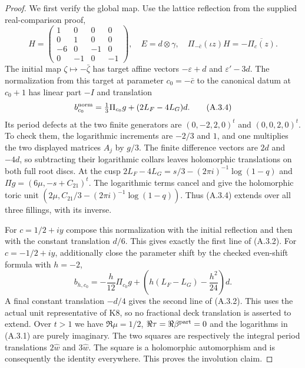 \begin{proof}
We first verify the global map. Use the lattice reflection from the
supplied real-comparison proof,
\[
 H=\begin{pmatrix}1&0&0&0\\0&1&0&0\\-6&0&-1&0\\0&-1&0&-1\end{pmatrix},
 \quad E=d\otimes\gamma,
 \quad\Pi_{-\bar c}(\iota z)H=-\overline{\Pi_c(z)}.
\]
The initial map $\zeta\mapsto-\bar\zeta$ has target affine vectors
$-\varepsilon+d$ and $\varepsilon'-3d$. The normalization from this
target at parameter $c_0=-\bar c$ to the canonical datum at $c_0+1$
has linear part $-I$ and translation
\[
 b^{\rm norm}_{c_0}=\tfrac13\Pi_{c_0}g+(2L_F-4L_G)d.
 \tag{A.3.4}
\]
Its period defects at the two finite generators are
$(0,-2,2,0)^t$ and $(0,0,2,0)^t$. To check them, the logarithmic increments
are $-2/3$ and $1$, and one multiplies the two displayed matrices $A_j$
by $g/3$. The finite difference vectors are $2d$ and $-4d$, so subtracting
their logarithmic collars leaves holomorphic translations on both full
root discs. At the cusp
$2L_F-4L_G=s/3-(2\pi i)^{-1}\log(1-q)$ and
$\Pi g=(6\mu,-s+C_{21})^t$. The logarithmic terms cancel and give the
holomorphic toric unit
$(2\mu,C_{21}/3-(2\pi i)^{-1}\log(1-q))$.
Thus (A.3.4) extends over all three fillings, with its inverse.

For $c=1/2+iy$ compose this normalization with the initial reflection
and then with the constant translation $d/6$. This gives exactly the
first line of (A.3.2). For $c=-1/2+iy$, additionally close the parameter
shift by the checked even-shift formula with $h=-2$,
\[
 b_{h,c_0}=-\frac h{12}\Pi_{c_0}g+
 \left(h(L_F-L_G)-\frac{h^2}{24}\right)d.
\]
A final constant translation $-d/4$ gives the second line of (A.3.2).
This uses the actual unit representative of K8, so no fractional deck
translation is asserted to extend. Over $t>1$ we have
$\Re\mu=1/2$, $\Re\tau=\Re\beta^{\rm part}=0$ and the logarithms in
(A.3.1) are purely imaginary. The two squares are respectively the
integral period translations $2\widehat w$ and $3\widehat w$.
The square is a holomorphic automorphism and is consequently the
identity everywhere. This proves the involution claim.


\end{proof}
